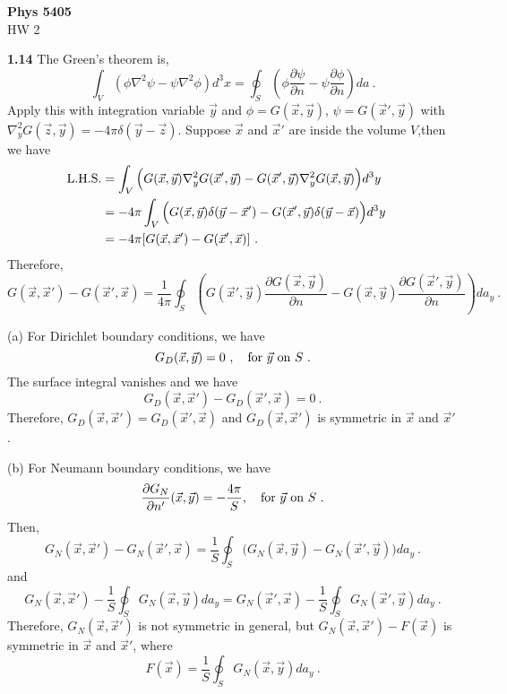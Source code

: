 \documentclass[12pt]{article}
\begin{document}
\begin{center}
{\bf Phys 5405}\\
HW 2
\end{center}
\textbf{1.14} The Green's theorem is,
\begin{equation}
    \int_V (\phi \nabla^2 \psi - \psi \nabla^2 \phi) d^3 x = \oint_S \left(\phi \frac{\partial \psi}{\partial n} - \psi \frac{\partial \phi}{\partial n} \right) da~.
\end{equation}
Apply this with integration variable $\vec y$ and $\phi = G(\vec x, \vec y)$, $\psi = G(\vec x', \vec y)$ with $\nabla^2_y G(\vec z, \vec y) = -4\pi \delta(\vec y - \vec z)$. Suppose $\vec x$ and $\vec x'$ are inside the volume $V$,then we have
\begin{align}
    {\rm L.H.S.} &= \int_V \Big(G(\vec x, \vec y) \nabla^2_y G(\vec x', \vec y) - G(\vec x', \vec y) \nabla^2_y G(\vec x, \vec y)\Big) d^3 y \cr
    &= -4\pi \int_V \Big(G(\vec x, \vec y) \delta(\vec y - \vec x') - G(\vec x', \vec y) \delta(\vec y - \vec x)\Big) d^3 y \cr
    &= -4\pi [G(\vec x, \vec x') - G(\vec x', \vec x)]~.
\end{align}
Therefore,
\begin{equation}
    G(\vec x, \vec x') - G(\vec x', \vec x) = \frac{1}{4\pi} \oint_S \left(G(\vec x', \vec y) \frac{\partial G(\vec x, \vec y)}{\partial n} - G(\vec x, \vec y) \frac{\partial G(\vec x', \vec y)}{\partial n}\right)da_y~.
\end{equation}

\newpage
\noindent(a) For Dirichlet boundary conditions, we have
\begin{equation}
    G_D(\vec x, \vec y) = 0~, \quad {\rm for}~\vec y~{\rm on}~S~.
\end{equation}
The surface integral vanishes and we have
\begin{equation}
    G_D(\vec x, \vec x') - G_D(\vec x', \vec x) = 0~.
\end{equation}
Therefore, $G_D(\vec x, \vec x') = G_D(\vec x', \vec x)$ and $G_D(\vec x, \vec x')$ is symmetric in $\vec x$ and $\vec x'$.

\newpage
\noindent(b) For Neumann boundary conditions, we have
\begin{equation}
    \frac{\partial G_N}{\partial n'} (\vec x, \vec y) = - \frac{4\pi}{S},\quad {\rm for}~\vec y~{\rm on}~S~.
\end{equation}
Then,
\begin{equation}
    G_N(\vec x, \vec x') - G_N(\vec x', \vec x) = \frac{1}{S} \oint_S \Big( G_N(\vec x, \vec y)  - G_N(\vec x', \vec y)  \Big)da_y~.
\end{equation}
and
\begin{equation}
    G_N(\vec x, \vec x') - \frac{1}{S} \oint_S G_N(\vec x, \vec y) da_y = G_N(\vec x', \vec x) - \frac{1}{S} \oint_S  G_N(\vec x', \vec y) da_y~.
\end{equation}
Therefore, $G_N(\vec x, \vec x')$ is not symmetric in general, but $G_N(\vec x, \vec x') - F(\vec x)$ is symmetric in $\vec x$ and $\vec x'$, where
\begin{equation}
    F(\vec x) = \frac{1}{S} \oint_S G_N(\vec x, \vec y) da_y~.
\end{equation}
\end{document}

